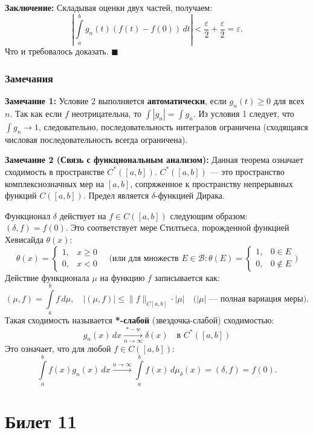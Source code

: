 \documentclass[12pt,a4paper,openany]{book}
\begin{document}
\textbf{Заключение:}
Складывая оценки двух частей, получаем:
\[
\left| \int\limits_{a}^{b} g_n(t)(f(t) - f(0))\,dt \right| < \frac{\varepsilon}{2} + \frac{\varepsilon}{2} = \varepsilon.
\]
Что и требовалось доказать. $\blacksquare$

\subsection{Замечания}

\textbf{Замечание 1:}
Условие 2 выполняется \textbf{автоматически}, если $g_n(t) \ge 0$ для всех $n$.
Так как если $f$ неотрицательна, то $\int |g_n| = \int g_n$. Из условия 1 следует, что $\int g_n \to 1$, следовательно, последовательность интегралов ограничена (сходящаяся числовая последовательность всегда ограничена).

\textbf{Замечание 2 (Связь с функциональным анализом):}
Данная теорема означает сходимость в пространстве $C^*([a, b])$.
$C^*([a, b])$ — это пространство комплекснозначных мер на $[a, b]$, сопряженное к пространству непрерывных функций $C([a, b])$. Предел является $\delta$-функцией Дирака.

Функционал $\delta$ действует на $f \in C([a, b])$ следующим образом: $(\delta, f) = f(0)$.
Это соответствует мере Стилтьеса, порожденной функцией Хевисайда $\theta(x)$:
\[
\theta(x) = \begin{cases} 1, & x \ge 0 \\ 0, & x < 0 \end{cases} \quad \text{(или для множеств } E \in \mathcal{B}: \theta(E) = \begin{cases} 1, & 0 \in E \\ 0, & 0 \notin E \end{cases} \text{)}
\]
Действие функционала $\mu$ на функцию $f$ записывается как:
\[
(\mu, f) = \int\limits_{a}^{b} f\,d\mu, \quad |(\mu, f)| \le \|f\|_{C[a,b]} \cdot |\mu| \quad \text{($|\mu|$ --- полная вариация меры)}.
\]
Такая сходимость называется \textbf{*-слабой} (звездочка-слабой) сходимостью:
\[
g_n(x)\,dx \xrightarrow[n \to \infty]{*-w} \delta(x) \quad \text{в } C^*([a, b])
\]
Это означает, что для любой $f \in C([a, b])$:
\[
\int\limits_{a}^{b} f(x) g_n(x)\,dx \xrightarrow{n \to \infty} \int\limits_{a}^{b} f(x)\,d\mu_{\delta}(x) = (\delta, f) = f(0).
\]

\chapter{Билет 11}
\end{document}
